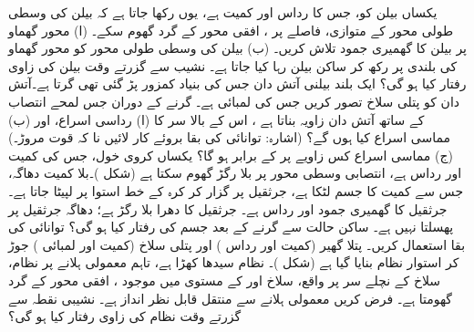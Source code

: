 یکساں بیلن  کو، جس کا رداس  اور کمیت  ہے،  یوں رکھا جاتا ہے کہ  بیلن کی   وسطی طولی محور کے متوازی،  فاصلے پر ، افقی محور کے گرد گھوم سکے۔ (ا)  محور گھماو پر بیلن کا گھمیری جمود تلاش کریں۔  (ب)  بیلن کی وسطی طولی محور کو محور گھماو کی بلندی پر رکھ کر  ساکن بیلن رہا کیا جاتا ہے۔ نشیب سے گزرتے وقت   بیلن کی زاوی رفتار کیا ہو گی؟
ایک بلند بیلنی آتش دان  جس کی بنیاد کمزور  پڑ گئی تھی گرتا ہے۔آتش دان کو پتلی سلاخ تصور کریں جس کی لمبائی  ہے۔ گرنے کے دوران جس لمحے انتصاب کے ساتھ آتش دان  زاویہ بناتا ہے ، اس کے بالا سر کا (ا) رداسی اسراع، اور (ب) مماسی اسراع کیا ہوں گے؟ (اشارہ: توانائی کی بقا بروئے کار لائیں نا کہ قوت مروڑ۔) (ج) مماسی اسراع کس زاویے  پر  کے برابر ہو گا؟
یکساں کروی خول، جس کی کمیت  اور رداس  ہے،  انتصابی وسطی محور  پر  بلا رگڑ  گھوم سکتا ہے (شکل )۔بلا کمیت دھاگہ، جس سے  کمیت کا جسم لٹکا ہے،   جرثقیل پر گزار کر کرہ کے خط استوا پر لپیٹا جاتا ہے۔ جرثقیل کا گھمیری جمود     اور  رداس  ہے۔ جرثقیل کا دھرا بلا رگڑ ہے؛ دھاگہ جرثقیل پر پھسلتا نہیں ہے۔ ساکن حالت سے     گرنے کے بعد جسم کی رفتار کیا ہو گی؟ توانائی کی بقا استعمال کریں۔
پتلا گھیر  (کمیت  اور رداس ) اور پتلی سلاخ (کمیت  اور لمبائی ) جوڑ کر استوار نظام بنایا گیا ہے (شکل )۔ نظام سیدھا کھڑا ہے، تاہم معمولی ہلانے پر نظام،  سلاخ کے نچلے سر پر واقع، سلاخ اور  کے  مستوی   میں موجود ، افقی محور کے گرد گھومتا ہے۔ فرض کریں معمولی ہلانے سے منتقل قابل نظر انداز ہے۔ نشیبی نقطہ سے گزرتے وقت نظام کی زاوی رفتار کیا ہو گی؟

